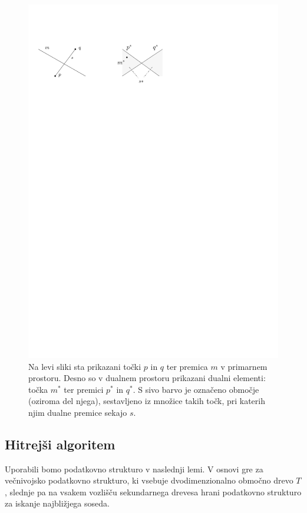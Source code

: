 \documentclass[a4paper, 12pt]{book}
\begin{document}
\begin{figure}[htp]
\centerline{\includegraphics[scale=1]{pics/dual-lines-example.pdf}}
\caption{Na levi sliki sta prikazani točki $p$ in $q$ ter premica $m$ v primarnem prostoru. Desno so v dualnem prostoru prikazani dualni elementi: točka $m^*$ ter premici $p^*$ in $q^*$. S sivo barvo je označeno območje (oziroma del njega), sestavljeno iz množice takih točk, pri katerih njim dualne premice sekajo $s$.} 
\label{dual-ex}
\end{figure}

\subsection{Hitrejši algoritem}
\label{compact}
Uporabili bomo podatkovno strukturo v naslednji lemi. V osnovi gre za večnivojsko podatkovno strukturo, ki vsebuje dvodimenzionalno območno drevo $T$, slednje pa na vsakem vozlišču sekundarnega drevesa hrani podatkovno strukturo za iskanje najbližjega soseda. 
\end{document}
